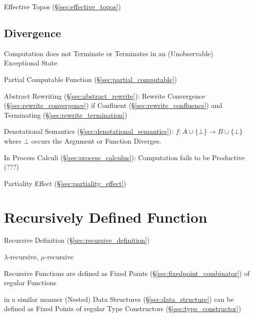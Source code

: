 Effective Topos (\S\ref{sec:effective_topos})



\subsection{Divergence}\label{sec:divergence}

Computation does not Terminate or Terminates in an (Unobservable)
Exceptional State

Partial Computable Function (\S\ref{sec:partial_computable})

Abstract Rewriting (\S\ref{sec:abstract_rewrite}): Rewrite Convergence
(\S\ref{sec:rewrite_convergence}) if Confluent
(\S\ref{sec:rewrite_confluence}) and Terminating
(\S\ref{sec:rewrite_termination})

Denotational Semantics (\S\ref{sec:denotational_semantics}): $f : A
\cup \{\bot\} \rightarrow B \cup \{\bot\}$ where $\bot$ occurs the
Argument or Function Diverges.

In Process Calculi (\S\ref{sec:process_calculus}): Computation fails
to be Productive (???) %

Partiality Effect (\S\ref{sec:partiality_effect})



\section{Recursively Defined Function}\label{sec:recursive_function}

Recursive Definition (\S\ref{sec:recursive_definition})

$\lambda$-recursive, $\mu$-recursive


Recursive Functions are defined as Fixed Points
(\S\ref{sec:fixedpoint_combinator}) of regular Functions

in a similar manner (Nested) Data Structures
(\S\ref{sec:data_structure}) can be defined as Fixed Points of regular
Type Constructors (\S\ref{sec:type_constructor})



